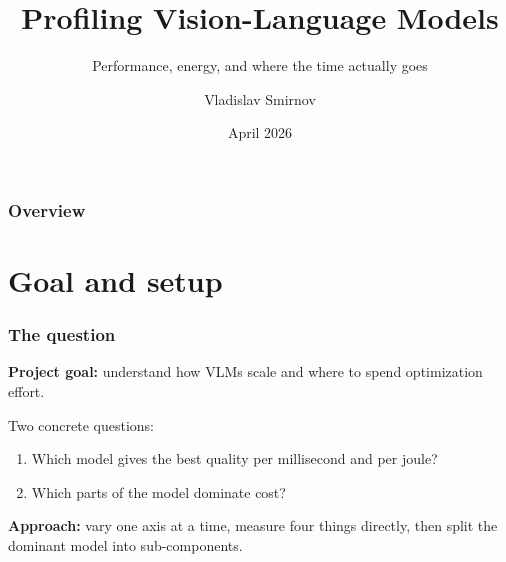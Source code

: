 \documentclass[
	11pt,
	aspectratio=169,
]{beamer}
\title[VLM Profiling]{Profiling Vision-Language Models}
\subtitle{Performance, energy, and where the time actually goes}
\author[V.\ Smirnov]{Vladislav Smirnov}
\institute[VLM Profiler]{\textit{github.com/smirnovlad/vlm-profiler}}
\date[Apr 2026]{April 2026}
\begin{document}

\begin{frame}
	\titlepage
\end{frame}


\begin{frame}
	\frametitle{Overview}
	\tableofcontents
\end{frame}

\section{Goal and setup}

\begin{frame}
	\frametitle{The question}

	\textbf{Project goal:} understand how VLMs scale and where to spend optimization effort.

	\bigskip

	Two concrete questions:
	\begin{enumerate}
		\item Which model gives the best quality per millisecond and per joule?
		\item \alert{Which parts of the model dominate cost?}
	\end{enumerate}

	\bigskip

	\textbf{Approach:} vary one axis at a time, measure four things directly, then split the dominant model into sub-components.
\end{frame}

\end{document}

